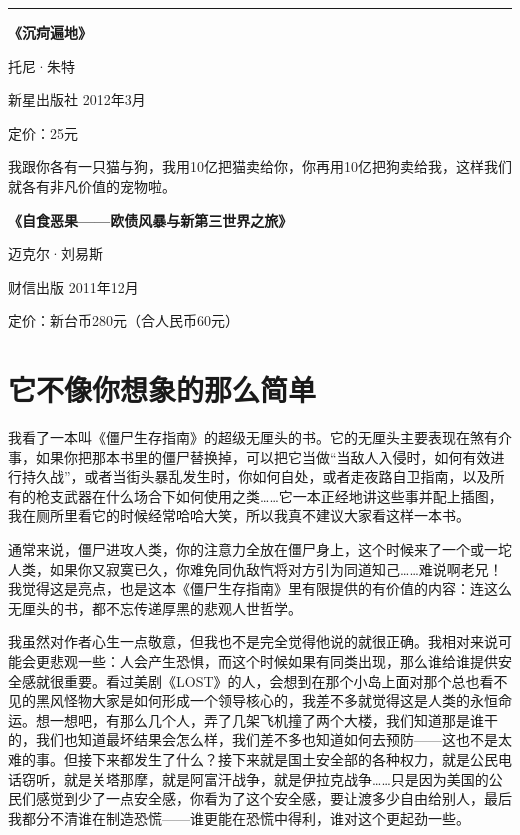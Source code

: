 \begin{center}\rule{0.5\linewidth}{0.5pt}\end{center}

\textbf{《沉疴遍地》}

托尼·朱特

新星出版社 2012年3月

定价：25元

我跟你各有一只猫与狗，我用10亿把猫卖给你，你再用10亿把狗卖给我，这样我们就各有非凡价值的宠物啦。

\textbf{《自食恶果------欧债风暴与新第三世界之旅》}

迈克尔·刘易斯

财信出版 2011年12月

定价：新台币280元（合人民币60元）

\hypertarget{ux5b83ux4e0dux50cfux4f60ux60f3ux8c61ux7684ux90a3ux4e48ux7b80ux5355}{%
\section{它不像你想象的那么简单}\label{ux5b83ux4e0dux50cfux4f60ux60f3ux8c61ux7684ux90a3ux4e48ux7b80ux5355}}

我看了一本叫《僵尸生存指南》的超级无厘头的书。它的无厘头主要表现在煞有介事，如果你把那本书里的僵尸替换掉，可以把它当做``当敌人入侵时，如何有效进行持久战''，或者当街头暴乱发生时，你如何自处，或者走夜路自卫指南，以及所有的枪支武器在什么场合下如何使用之类\ldots\ldots 它一本正经地讲这些事并配上插图，我在厕所里看它的时候经常哈哈大笑，所以我真不建议大家看这样一本书。

通常来说，僵尸进攻人类，你的注意力全放在僵尸身上，这个时候来了一个或一坨人类，如果你又寂寞已久，你难免同仇敌忾将对方引为同道知己\ldots\ldots 难说啊老兄！我觉得这是亮点，也是这本《僵尸生存指南》里有限提供的有价值的内容：连这么无厘头的书，都不忘传递厚黑的悲观人世哲学。

我虽然对作者心生一点敬意，但我也不是完全觉得他说的就很正确。我相对来说可能会更悲观一些：人会产生恐惧，而这个时候如果有同类出现，那么谁给谁提供安全感就很重要。看过美剧《LOST》的人，会想到在那个小岛上面对那个总也看不见的黑风怪物大家是如何形成一个领导核心的，我差不多就觉得这是人类的永恒命运。想一想吧，有那么几个人，弄了几架飞机撞了两个大楼，我们知道那是谁干的，我们也知道最坏结果会怎么样，我们差不多也知道如何去预防------这也不是太难的事。但接下来都发生了什么？接下来就是国土安全部的各种权力，就是公民电话窃听，就是关塔那摩，就是阿富汗战争，就是伊拉克战争\ldots\ldots 只是因为美国的公民们感觉到少了一点安全感，你看为了这个安全感，要让渡多少自由给别人，最后我都分不清谁在制造恐慌------谁更能在恐慌中得利，谁对这个更起劲一些。

